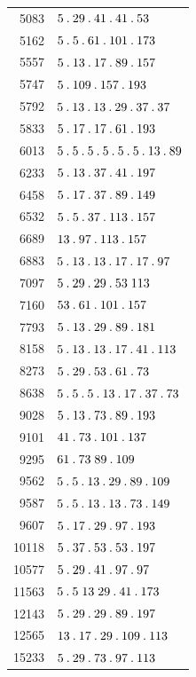 \begin{longtable}{@{}r|l@{}}
5083 & $5\pdot 29\pdot 41\pdot 41\pdot 53$\\
5162 & $5\pdot 5\pdot 61\pdot 101\pdot 173$\\
5557 & $5\pdot 13\pdot 17\pdot 89\pdot 157$\\
5747 & $5\pdot 109\pdot 157\pdot 193$\\
5792 & $5\pdot 13\pdot 13\pdot 29\pdot 37\pdot 37$\\
5833 & $5\pdot 17\pdot 17\pdot 61\pdot 193$\\
6013 & $5\pdot 5\pdot 5\pdot 5\pdot 5\pdot 5\pdot 13\pdot 89$\\
6233 & $5\pdot 13\pdot 37\pdot 41\pdot 197$\\
6458 & $5\pdot 17\pdot 37\pdot 89\pdot 149$\\
6532 & $5\pdot 5\pdot 37\pdot 113\pdot 157$\\
6689 & $13\pdot 97\pdot 113\pdot 157$\\
6883 & $5\pdot 13\pdot 13\pdot 17\pdot 17\pdot 97$\\
7097 & $5\pdot 29\pdot 29\pdot 53\;113$\\
7160 & $53\pdot 61\pdot 101\pdot 157$\\
7793 & $5\pdot 13\pdot 29\pdot 89\pdot 181$\\
8158 & $5\pdot 13\pdot 13\pdot 17\pdot 41\pdot 113$\\
8273 & $5\pdot 29\pdot 53\pdot 61\pdot 73$\\
8638 & $5\pdot 5\pdot 5\pdot 13\pdot 17\pdot 37\pdot 73$\\
9028 & $5\pdot 13\pdot 73\pdot 89\pdot 193$\\
9101 & $41\pdot 73\pdot 101\pdot 137$\\
9295 & $61\pdot 73\;89\pdot 109$\\
9562 & $5\pdot 5\pdot 13\pdot 29\pdot 89\pdot 109$\\
9587 & $5\pdot 5\pdot 13\pdot 13\pdot 73\pdot 149$\\
9607 & $5\pdot 17\pdot 29\pdot 97\pdot 193$\\
10118 & $5\pdot 37\pdot 53\pdot 53\pdot 197$\\
10577 & $5\pdot 29\pdot 41\pdot 97\pdot 97$\\
11563 & $5\pdot 5\;13\;29\pdot 41\pdot 173$\\
12143 & $5\pdot 29\pdot 29\pdot 89\pdot 197$\\
12565 & $13\pdot 17\pdot 29\pdot 109\pdot 113$\\
15233 & $5\pdot 29\pdot 73\pdot 97\pdot 113$\\

\end{longtable}
